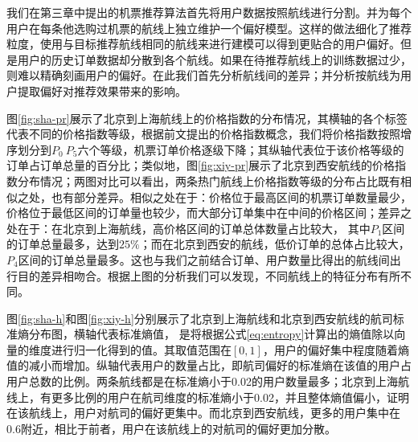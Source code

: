 我们在第三章中提出的机票推荐算法首先将用户数据按照航线进行分割。并为每个用户在每条他选购过机票的航线上独立维护一个偏好模型。这样的做法细化了推荐粒度，使用与目标推荐航线相同的航线来进行建模可以得到更贴合的用户偏好。但是用户的历史订单数据却分散到各个航线。如果在待推荐航线上的训练数据过少，则难以精确刻画用户的偏好。在此我们首先分析航线间的差异；并分析按航线为用户提取偏好对推荐效果带来的影响。

\begin{figure}[!h]
\centering
{}
\end{figure}

图\ref{fig:sha-pr}展示了北京到上海航线上的价格指数的分布情况，其横轴的各个标签代表不同的价格指数等级，根据前文提出的价格指数概念，我们将价格指数按照增序划分到$P_0 ~ P_5$六个等级，机票订单价格逐级下降；其纵轴代表位于该价格等级的订单占订单总量的百分比；类似地，图\ref{fig:xiy-pr}展示了北京到西安航线的价格指数分布情况；两图对比可以看出，两条热门航线上价格指数等级的分布占比既有相似之处，也有部分差异。相似之处在于：价格位于最高区间的机票订单数量最少，价格位于最低区间的订单量也较少，而大部分订单集中在中间的价格区间；差异之处在于：在北京到上海航线，高价格区间的订单总体数量占比较大，
其中$P_1$区间的订单总量最多，达到$25\%$；而在北京到西安的航线，低价订单的总体占比较大，
$P_4$区间的订单总量最多。这也与我们之前结合订单、用户数量比得出的航线间出行目的差异相吻合。根据上图的分析我们可以发现，不同航线上的特征分布有所不同。

\begin{figure}
\centering
{}
\end{figure}

图\ref{fig:sha-h}和图\ref{fig:xiy-h}分别展示了北京到上海航线和北京到西安航线的航司标准熵分布图，横轴代表标准熵值，
是将根据公式\ref{eq:entropy}计算出的熵值除以向量的维度进行归一化得到的值。其取值范围在$[0,1]$，用户的偏好集中程度随着熵值的减小而增加。纵轴代表用户的数量占比，即航司偏好的标准熵在该值的用户占用户总数的比例。两条航线都是在标准熵小于0.02的用户数量最多；北京到上海航线上，有更多比例的用户在航司维度的标准熵小于0.02，并且整体熵值偏小，证明在该航线上，用户对航司的偏好更集中。而北京到西安航线，更多的用户集中在0.6附近，相比于前者，用户在该航线上的对航司的偏好更加分散。

